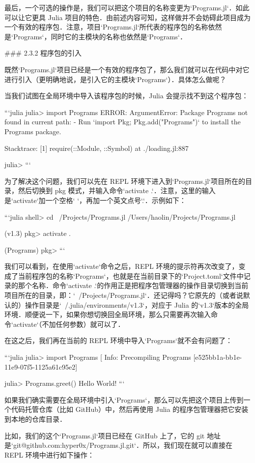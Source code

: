 最后，一个可选的操作是，我们可以把这个项目的名称变更为`Programs.jl`．如此可以让它更具 Julia 项目的特色．由前述内容可知，这样做并不会妨碍此项目成为一个有效的程序包．注意，项目`Programs.jl`所代表的程序包的名称依然是`Programs`，同时它的主模块的名称也依然是`Programs`．

### 2.3.2 程序包的引入

既然`Programs.jl`项目已经是一个有效的程序包了，那么我们就可以在代码中对它进行引入（更明确地说，是引入它的主模块`Programs`）．具体怎么做呢？

当我们试图在全局环境中导入该程序包的时候，Julia 会提示找不到这个程序包：

```julia
julia> import Programs
ERROR: ArgumentError: Package Programs not found in current path:
- Run `import Pkg; Pkg.add("Programs")` to install the Programs package.

Stacktrace:
 [1] require(::Module, ::Symbol) at ./loading.jl:887

julia> 
```

为了解决这个问题，我们可以先在 REPL 环境下进入到`Programs.jl`项目所在的目录，然后切换到 pkg 模式，并输入命令`activate .`．注意，这里的输入是`activate`加一个空格` `，再加一个英文点号`.`．示例如下：

```julia
shell> cd ~/Projects/Programs.jl
/Users/haolin/Projects/Programs.jl

(v1.3) pkg> activate .

(Programs) pkg> 
```

我们可以看到，在使用`activate`命令之后，REPL 环境的提示符再次改变了，变成了当前程序包的名称`Programs`，也就是在当前目录下的`Project.toml`文件中记录的那个名称．命令`activate .`的作用正是把程序包管理器的操作目录切换到当前项目所在的目录，即：`~/Projects/Programs.jl`．还记得吗？它原先的（或者说默认的）操作目录是`~/.julia/environments/v1.3`，对应于 Julia 的`v1.3`版本的全局环境．顺便说一下，如果你想切换回全局环境，那么只需要再次输入命令`activate`（不加任何参数）就可以了．

在这之后，我们再在当前的 REPL 环境中导入`Programs`就不会有问题了：

```julia
julia> import Programs
[ Info: Precompiling Programs [e525bb1a-bb1e-11e9-07f5-1125a61c95e2]

julia> Programs.greet()
Hello World!
```

如果我们确实需要在全局环境中引入`Programs`，那么可以先把这个项目上传到一个代码托管仓库（比如 GitHub）中，然后再使用 Julia 的程序包管理器把它安装到本地的仓库目录． 

比如，我们的这个`Programs.jl`项目已经在 GitHub 上了，它的 git 地址是`git@github.com:hyper0x/Programs.jl.git`．所以，我们现在就可以直接在 REPL 环境中进行如下操作：

